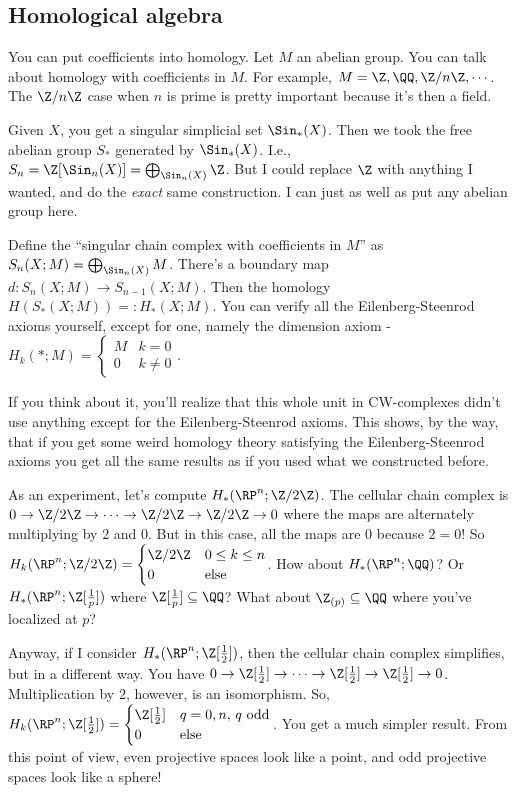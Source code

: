 \subsection{Homological algebra}
You can put coefficients into homology. Let $M$ an abelian group. You can talk about homology with coefficients in $M$. For example, $M=\Z,\QQ,\Z/n\Z,\cdots$. The $\Z/n\Z$ case when $n$ is prime is pretty important because it's then a field.

Given $X$, you get a singular simplicial set $\Sin_\ast(X)$. Then we took the free abelian group $S_\ast$ generated by $\Sin_\ast(X)$. I.e., $S_n=\Z[\Sin_n(X)]=\bigoplus_{\Sin_n(X)}\Z$. But I could replace $\Z$ with anything I wanted, and do the \emph{exact} same construction. I can just as well as put any abelian group here.

Define the ``singular chain complex with coefficients in $M$'' as $S_n(X;M)=\bigoplus_{\Sin_n(X)}M$. There's a boundary map $d:S_n(X;M)\to S_{n-1}(X;M)$. Then the homology $ H(S_\ast(X;M))=: H_\ast(X;M)$. You can verify all the Eilenberg-Steenrod axioms yourself, except for one, namely the dimension axiom - $ H_k(\ast;M)=\begin{cases}M & k=0 \\ 0 & k\neq 0\end{cases}$.

If you think about it, you'll realize that this whole unit in CW-complexes didn't use anything except for the Eilenberg-Steenrod axioms. This shows, by the way, that if you get some weird homology theory satisfying the Eilenberg-Steenrod axioms you get all the same results as if you used what we constructed before.

As an experiment, let's compute $ H_\ast(\RP^n;\Z/2\Z)$. The cellular chain complex is $0\to \Z/2\Z\to\cdots\to\Z/2\Z\to\Z/2\Z\to 0$ where the maps are alternately multiplying by $2$ and $0$. But in this case, all the maps are $0$ because $2=0$! So $ H_k(\RP^n;\Z/2\Z)=\begin{cases}\Z/2\Z & 0\leq k\leq n \\ 0 & \text{else}\end{cases}$. How about $ H_\ast(\RP^n;\QQ)$? Or $ H_\ast(\RP^n;\Z[\frac{1}{p}])$ where $\Z[\frac{1}{p}]\subseteq \QQ$? What about $\Z_{(p)}\subseteq \QQ$ where you've localized at $p$?

Anyway, if I consider $ H_\ast(\RP^n;\Z[\frac{1}{2}])$, then the cellular chain complex simplifies, but in a different way. You have $0\to \Z[\frac{1}{2}] \to\cdots\to \Z[\frac{1}{2}] \to \Z[\frac{1}{2}] \to 0$. Multiplication by $2$, however, is an isomorphism. So, $ H_k(\RP^n;\Z[\frac{1}{2}])=\begin{cases}\Z[\frac{1}{2}] & q=0,n,\, q \text{ odd} \\ 0 & \text{else}\end{cases}$. You get a much simpler result. From this point of view, even projective spaces look like a point, and odd projective spaces look like a sphere!

